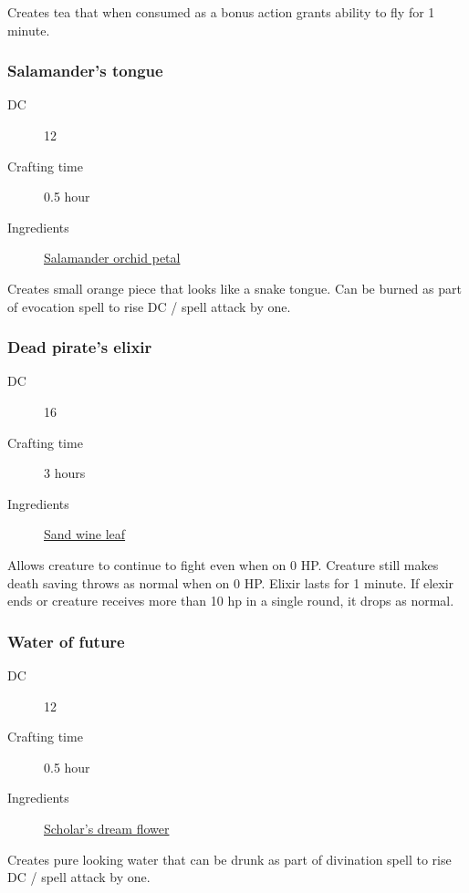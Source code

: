 Creates tea that when consumed as a bonus action grants ability to fly for 1 minute.

\subsubsection{Salamander's tongue}
\label{Salamander's tongue}

\begin{description}
\item [DC] 12
\item [Crafting time] 0.5 hour
\item [Ingredients] \hyperref[Salamander Orchid]{Salamander orchid petal}
\end{description}

Creates small orange piece that looks like a snake tongue. 
Can be burned as part of evocation spell to rise DC / spell attack by one.

\subsubsection{Dead pirate's elixir}
\label{Dead pirate's elixir}

\begin{description}
\item [DC] 16
\item [Crafting time] 3 hours
\item [Ingredients] \hyperref[Sand vine]{Sand wine leaf}
\end{description}

Allows creature to continue to fight even when on 0 HP. Creature still makes death saving throws as normal when on 0 HP. 
Elixir lasts for 1 minute. If elexir ends or creature receives more than 10 hp in a single round, it drops 
as normal.

\subsubsection{Water of future}
\label{Water of future}

\begin{description}
\item [DC] 12
\item [Crafting time] 0.5 hour
\item [Ingredients] \hyperref[Scholar's dream]{Scholar's dream flower}
\end{description}

Creates pure looking water that can be drunk as part of divination spell to rise DC / spell attack by one.

